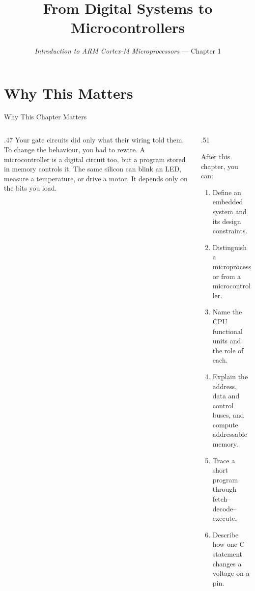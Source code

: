 \documentclass[9pt,aspectratio=169,xcolor=table]{beamer}
\title{From Digital Systems to Microcontrollers}
\subtitle{\emph{Introduction to ARM Cortex-M Microprocessors} --- Chapter 1}
\begin{document}
\titlepage

\section{Why This Matters}

\begin{frame}{Why This Chapter Matters}
    \begin{columns}[c]
    \begin{column}{.47\textwidth}
        {\normalsize Your gate circuits did only what their \alert{wiring} told them. To change the behaviour, you had to rewire. A microcontroller is a digital circuit too, but a \alert{program stored in memory} controls it. The same silicon can blink an LED, measure a temperature, or drive a motor. It depends only on the bits you load.}
    \end{column}
    \begin{column}{.51\textwidth}
        \begin{block}{After this chapter, you can:}
        {\small
        \begin{enumerate}\itemsep2pt
            \item Define an embedded system and its design constraints.
            \item Distinguish a \alert{microprocessor} from a \alert{microcontroller}.
            \item Name the CPU functional units and the role of each.
            \item Explain the address, data and control buses, and compute addressable memory.
            \item Trace a short program through fetch--decode--execute.
            \item Describe how one C statement changes a voltage on a pin.
        \end{enumerate}}
        \end{block}
    \end{column}
    \end{columns}
\end{frame}
\end{document}
